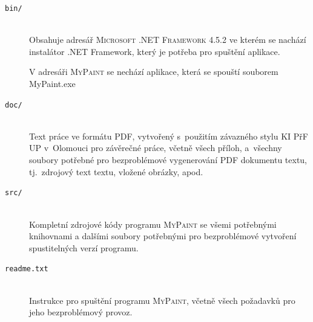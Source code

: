 \documentclass[
  field=inf,
  biblatex=false,
  glossaries,
  index
]{kidiplom}
\begin{document}
\begin{description}

\item[\texttt{bin/}] \hfill \\
  Obsahuje adresář \textsc{Microsoft .NET Framework 4.5.2} ve kterém se nachází instalátor .NET Framework, který je potřeba pro spuštění aplikace.
  
  V adresáři \textsc{MyPaint} se nechází aplikace, která se spouští souborem MyPaint.exe

\item[\texttt{doc/}] \hfill \\
  Text práce ve formátu PDF, vytvořený s~použitím závazného stylu KI
  PřF UP v~Olomouci pro závěrečné práce, včetně všech příloh,
  a~všechny soubory potřebné pro bezproblémové vygenerování PDF
  dokumentu textu, tj.~zdrojový text textu, vložené
  obrázky, apod.

\item[\texttt{src/}] \hfill \\
  Kompletní zdrojové kódy programu \textsc{MyPaint} se všemi potřebnými knihovnami a dalšími soubory potřebnými pro bezproblémové vytvoření spustitelných verzí programu.

\item[\texttt{readme.txt}] \hfill \\
  Instrukce pro spuštění programu \textsc{MyPaint}, včetně všech požadavků pro
jeho bezproblémový provoz.


\end{description}


\printglossary


\nocite{*}
\end{document}
